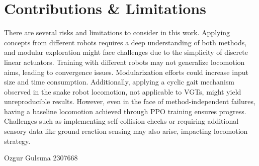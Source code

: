 \documentclass[9pt]{osa-supplemental-document}
\begin{document}
\section{Contributions \& Limitations} 
There are several risks and limitations to consider in this work. Applying concepts from different robots requires a deep understanding of both methods, and modular exploration might face challenges due to the simplicity of discrete linear actuators. Training with different robots may not generalize locomotion aims, leading to convergence issues. Modularization efforts could increase input size and time consumption. Additionally, applying a cyclic gait mechanism observed in the snake robot locomotion, not applicable to VGTs, might yield unreproducible results. However, even in the face of method-independent failures, having a baseline locomotion achieved through PPO training ensures progress. Challenges such as implementing self-collision checks or requiring additional sensory data like ground reaction sensing may also arise, impacting locomotion strategy.

\vspace{4em}
\hfill Ozgur Gulsuna 2307668
\end{document}
